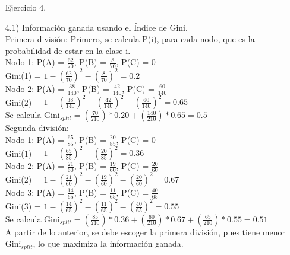 \documentclass[11pt,a4paper]{report}
\begin{document}
\begin{itemize}
\item[Ejercicio 4.] 
\item[4.1)] Información ganada usando el Índice de Gini.\\

\underline{Primera división}: Primero, se calcula P(i), para cada nodo, que es la probabilidad de estar en la clase i.\\

Nodo 1: P(A) = $\frac{62}{70}$, P(B) = $\frac{8}{70}$, P(C) = $0$ \\

Gini(1) = $1-(\frac{62}{70})^2-(\frac{8}{70})^2 = 0.2$  \\

Nodo 2: P(A) = $\frac{38}{140}$, P(B) = $\frac{42}{140}$, P(C) = $\frac{60}{140}$ \\

Gini(2) = $1-(\frac{38}{140})^2-(\frac{42}{140})^2 - (\frac{60}{140})^2 =0.65$ \\

Se calcula Gini$_{split}=(\frac{70}{210})*0.20 + (\frac{140}{210})*0.65 = 0.5$\\

\underline{Segunda división}: \\

Nodo 1: P(A) = $\frac{65}{85}$, P(B) = $\frac{20}{85}$, P(C) = $0$ \\

Gini(1) = $1-(\frac{65}{85})^2-(\frac{20}{85})^2 = 0.36$ \\

Nodo 2: P(A) = $\frac{21}{60}$, P(B) = $\frac{19}{60}$, P(C) = $\frac{20}{60}$ \\

Gini(2) = $1-(\frac{21}{60})^2-(\frac{19}{60})^2 - (\frac{20}{60})^2 =0.67$ \\

Nodo 3: P(A) = $\frac{14}{65}$, P(B) = $\frac{11}{65}$, P(C) = $\frac{40}{65}$ \\

Gini(3) = $1-(\frac{14}{65})^2-(\frac{11}{65})^2 - (\frac{40}{65})^2 =0.55$ \\

Se calcula Gini$_{split}=(\frac{85}{210})*0.36 + (\frac{60}{210})*0.67 + (\frac{65}{210})*0.55 = 0.51$\\

A partir de lo anterior, se debe escoger la primera división, pues tiene menor Gini$_{split}$, lo que maximiza la información ganada.


\end{itemize}
\end{document}
